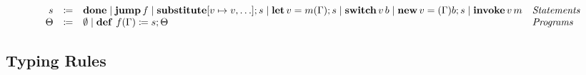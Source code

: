 
\begin{definition}
    \[ 
      \begin{array}{r c l l}
        s & \coloneqq & \mathbf{done}  \mid \mathbf{jump}\, f \mid \mathbf{substitute}[v \mapsto v,\ldots];s \mid \mathbf{let}\, v = m(\Gamma); s \mid \mathbf{switch}\, v\, b \mid \mathbf{new}\, v = (\Gamma)b; s \mid \mathbf{invoke}\, v\, m & \emph{Statements}\\
        \Theta & \coloneqq & \emptyset \mid \mathbf{def}\ f(\Gamma) \coloneq s; \Theta & \emph{Programs}\\
      \end{array}
    \]
\end{definition}

\subsection{Typing Rules}
\label{subsec:axcut:typing-rules}

